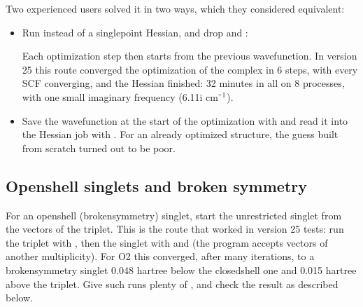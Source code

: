 \documentclass[letterpaper,10pt,english,openany,oneside]{sphinxmanual}
\begin{document}
\sphinxAtStartPar
{} Two experienced users solved it in two ways, which they considered equivalent:
\begin{itemize}
\item {} 
\sphinxAtStartPar
Run  instead of a single\sphinxhyphen{}point Hessian, and drop  and :

\begin{sphinxVerbatim}[commandchars=\\\{\}]
\end{sphinxVerbatim}

\sphinxAtStartPar
Each optimization step then starts from the previous wavefunction. In version 25 this route converged the
optimization of the complex in 6 steps, with every SCF converging, and the Hessian finished: 32 minutes in all on
8 processes, with one small imaginary frequency (6.11i cm⁻\(\sp{\text{1}}\)). 

\item {} 
\sphinxAtStartPar
Save the wavefunction at the start of the optimization with {\hyperref[\detokenize{reference/control:control-save}]{}} and read it into the Hessian
job with . For an already optimized structure, the guess built from scratch turned out to be poor.



\end{itemize}


\subsection{Open\sphinxhyphen{}shell singlets and broken symmetry}
\label{\detokenize{troubleshooting/common-problems:open-shell-singlets-and-broken-symmetry}}\label{\detokenize{troubleshooting/common-problems:troubleshooting-open-shell-singlet}}
\sphinxAtStartPar
For an open\sphinxhyphen{}shell (broken\sphinxhyphen{}symmetry) singlet, start the unrestricted singlet from the vectors of the triplet. This is
the route that worked in version 25 tests: run the triplet with {\hyperref[\detokenize{reference/control:control-save}]{}}, then the singlet with
 and  (the program accepts vectors of another multiplicity). For O2 this converged, after
many iterations, to a broken\sphinxhyphen{}symmetry singlet 0.048 hartree below the closed\sphinxhyphen{}shell one and 0.015 hartree above the
triplet. Give such runs plenty of {\hyperref[\detokenize{reference/scf:scf-iterations}]{}}, and check the result as described below.
\end{document}
